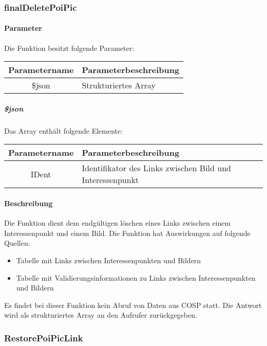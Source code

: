 \subsubsection{finalDeletePoiPic}
\paragraph{Parameter} Die Funktion besitzt folgende Parameter:
\begin{table}[H]
	\begin{tabular}{|c|p{11cm}|}
		\hline
		\textbf{Parametername} & \textbf{Parameterbeschreibung} \\ \hline
		\$json & Strukturiertes Array \\ \hline
	\end{tabular}
\end{table}
\subparagraph{\$json}Das Array enthält folgende Elemente:
\begin{table}[H]
	\begin{tabular}{|c|p{11cm}|}
		\hline
		\textbf{Parametername} & \textbf{Parameterbeschreibung} \\ \hline
		IDent & Identifikator des Links zwischen Bild und Interessenpunkt \\ \hline
	\end{tabular}
\end{table}
\paragraph{Beschreibung} Die Funktion dient dem endgültigen löschen eines Links zwischen einem Interessenpunkt und einem Bild. Die Funktion hat Auswirkungen auf folgende Quellen:
\begin{itemize}
	\item Tabelle mit Links zwischen Interessenpunkten und Bildern
	\item Tabelle mit Validierungsinformationen zu Links zwischen Interessenpunkten und Bildern
\end{itemize}
Es findet bei dieser Funktion kein Abruf von Daten aus {\glqq COSP\grqq} statt. Die Antwort wird als strukturiertes Array an den Aufrufer zurückgegeben.
\subsubsection{RestorePoiPicLink}
